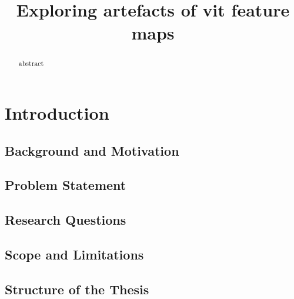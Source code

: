 \documentclass[conference, onecolumn]{IEEEtran}
\begin{document}
  \title{Exploring artefacts of \acl{vit} feature maps}

  \author{
    }

  \maketitle

  \begin{abstract}
  abstract
  \end{abstract}


  \IEEEpeerreviewmaketitle

    \newpage

 \tableofcontents
  \newpage

  \section{Introduction}
  \label{sec:introduction}

  \subsection{Background and Motivation}
  \label{subsec:motivation}

  \subsection{Problem Statement}
  \label{subsec:problem-statement}

  \subsection{Research Questions}
  \label{subsec:research-questions}

  \subsection{Scope and Limitations}
  \label{subsec:scope-limitations}

  \subsection{Structure of the Thesis}
  \label{subsec:structure-thesis}
\end{document}
